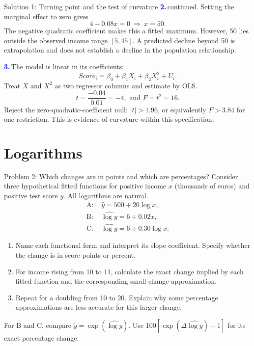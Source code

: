 \documentclass[notes,10pt, aspectratio=169]{beamer}
\newcommand{\answerpart}[1]{\textcolor{blue}{\textbf{#1.}}\,}
\begin{document}
\begin{frame}{Solution 1: Turning point and the test of curvature}
\small
\answerpart{2}continued. Setting the marginal effect to zero gives
\[
4-0.08x=0\ \Longrightarrow\ x=50.
\]
The negative quadratic coefficient makes this a fitted maximum. However, 50 lies outside the observed income range $[5,45]$. A predicted decline beyond 50 is extrapolation and does not establish a decline in the population relationship.
\par\medskip
\answerpart{3}The model is linear in its coefficients:
\[
Score_i=\beta_0+\beta_1X_i+\beta_2X_i^2+U_i.
\]
Treat $X$ and $X^2$ as two regressor columns and estimate by OLS.
\[
t=\frac{-0.04}{0.01}=-4,\text{ and }F=t^2=16.
\]
Reject the zero-quadratic-coefficient null: $|t|>1.96$, or equivalently $F>3.84$ for one restriction. This is evidence of curvature within this specification.
\end{frame}
\fi

\section{Logarithms}
\begin{frame}{Problem 2: Which changes are in points and which are percentages?}
\small
Consider three hypothetical fitted functions for positive income $x$ (thousands of euros) and positive test score $y$. All logarithms are natural.
\[
\begin{aligned}
\text{A: }&\hat y=500+20\log x,\\
\text{B: }&\widehat{\log y}=6+0.02x,\\
\text{C: }&\widehat{\log y}=6+0.30\log x.
\end{aligned}
\]
\begin{enumerate}
\item Name each functional form and interpret its slope coefficient. Specify whether the change is in score points or percent.
\item For income rising from 10 to 11, calculate the exact change implied by each fitted function and the corresponding small-change approximation.
\item Repeat for a doubling from 10 to 20. Explain why some percentage approximations are less accurate for this larger change.
\end{enumerate}
For B and C, compare $\tilde y=\exp(\widehat{\log y})$. Use
$100[\exp(\Delta\widehat{\log y})-1]$ for its exact percentage change.
\end{frame}
\end{document}
